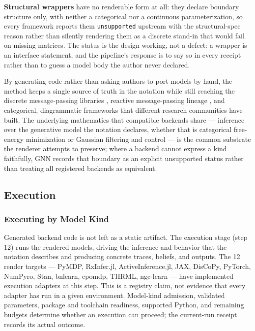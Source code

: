 \documentclass[
  english,
  9pt,
]{extarticle}
\begin{document}
\textbf{Structural wrappers} have no renderable form at all: they
declare boundary structure only, with neither a categorical nor a
continuous parameterization, so every framework reports them
\texttt{unsupported} upstream with the structural-spec reason rather
than silently rendering them as a discrete stand-in that would fail on
missing matrices. The status is the design working, not a defect: a
wrapper is an interface statement, and the pipeline's response is to say
so in every receipt rather than to guess a model body the author never
declared.

By generating code rather than asking authors to port models by hand,
the method keeps a single source of truth in the notation while still
reaching the discrete message-passing libraries \citep{heins2022},
reactive message-passing lineage
\citep{bagaev2021reactiveMessagePassing}, and categorical, diagrammatic
frameworks \citep{defelice2021} that different research communities have
built. The underlying mathematics that compatible backends share ---
inference over the generative model the notation declares, whether that
is categorical free-energy minimization \citep{dacosta2020, smith2022}
or Gaussian filtering and control --- is the common substrate the
renderer attempts to preserve; where a backend cannot express a kind
faithfully, GNN records that boundary as an explicit unsupported status
rather than treating all registered backends as equivalent.

\subsection{Execution}\label{execution}

\subsubsection{Executing by Model Kind}\label{executing-by-model-kind}

Generated backend code is not left as a static artifact. The execution
stage (step 12) runs the rendered models, driving the inference and
behavior that the notation describes and producing concrete traces,
beliefs, and outputs. The 12 render targets --- PyMDP, RxInfer.jl,
ActiveInference.jl, JAX, DisCoPy, PyTorch, NumPyro, Stan, bnlearn,
cpomdp, THRML, ngc-learn --- have implemented execution adapters at this
step. This is a registry claim, not evidence that every adapter has run
in a given environment. Model-kind admission, validated parameters,
package and toolchain readiness, supported Python, and remaining budgets
determine whether an execution can proceed; the current-run receipt
records its actual outcome.
\end{document}
